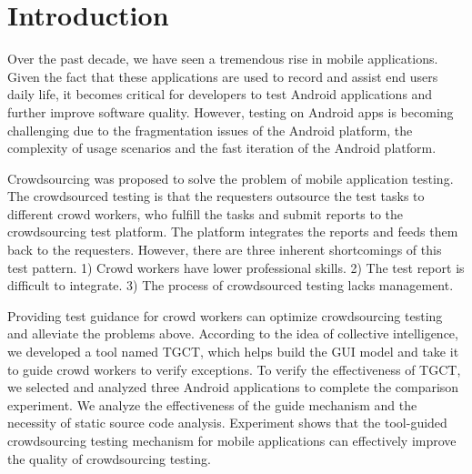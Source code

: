 \section{Introduction}
Over the past decade, we have seen a tremendous rise in mobile applications. Given the fact that these applications are used to record and assist end users daily life, it becomes critical for developers to test Android applications and further improve software quality. However, testing on Android apps is becoming challenging due to the fragmentation issues of the Android platform\cite{park2013fragmentation}, the complexity of usage scenarios and the fast iteration of the Android platform.

Crowdsourcing was proposed to solve the problem of mobile application testing. The crowdsourced testing is that the requesters outsource the test tasks to different crowd workers, who fulfill the tasks and submit reports to the crowdsourcing test platform. The platform integrates the reports and feeds them back to the requesters\cite{feng2015test}. However, there are three inherent shortcomings of this test pattern. 1) Crowd workers have lower professional skills. 2) The test report is difficult to integrate. 3) The process of crowdsourced testing lacks management. 

Providing test guidance for crowd workers can optimize crowdsourcing testing and alleviate the problems above\cite{zhang2016guiding}. According to the idea of collective intelligence\cite{woolley2010evidence}, we developed a tool named TGCT, which helps build the GUI model and take it to guide crowd workers to verify exceptions. To verify the effectiveness of TGCT, we selected and analyzed three Android applications to complete the comparison experiment. We analyze the effectiveness of the guide mechanism and the necessity of static source code analysis. Experiment shows that the tool-guided crowdsourcing testing mechanism for mobile applications can effectively improve the quality of crowdsourcing testing.



